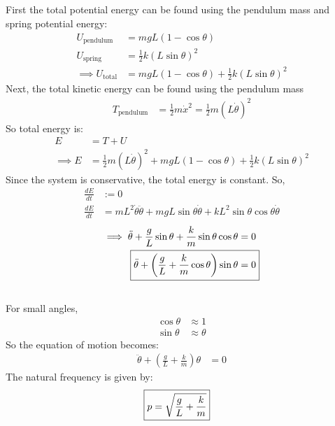 \subsection{}
First the total potential energy can be found using the pendulum mass and spring potential energy:
\begin{align*}
    U_{\text{pendulum}} &= m g L (1 - \cos \theta) \\
    U_{\text{spring}} &= \frac{1}{2} k (L \sin \theta)^2  \\
    \implies U_{\text{total}} &= m g L (1 - \cos \theta) + \frac{1}{2} k (L \sin \theta)^2
\end{align*}
Next, the total kinetic energy can be found using the pendulum mass 
\begin{align*}
    T_{\text{pendulum}} &= \frac{1}{2} m \dot{x}^2  = \frac{1}{2} m (L \dot{\theta})^2 
\end{align*}
So total energy is:
\begin{align*}
    E &= T + U \\
    \implies E &= \frac{1}{2} m (L \dot{\theta})^2 + m g L (1 - \cos \theta) + \frac{1}{2} k (L \sin \theta)^2
\end{align*}
Since the system is conservative, the total energy is constant. So,
\begin{align*}
    \frac{dE}{dt} &:= 0 \\
    \frac{dE}{dt} &= m L^2 \dot{\theta} \ddot{\theta} + m g L \sin \theta \dot{\theta} + k L^2 \sin \theta \cos \theta \dot{\theta} 
\end{align*}
\begin{align*}
    \implies \ddot{\theta} + \frac{g}{L} \sin \theta + \frac{k}{m} \sin \theta \cos \theta &= 0 \\
    \Aboxed{\ddot{\theta} + \left(\frac{g}{L} + \frac{k}{m} \cos \theta\right) \sin \theta &= 0}
\end{align*}

\subsection{}
For small angles,
\begin{align*}
    \cos \theta &\approx 1 \\
    \sin \theta &\approx \theta
\end{align*}
So the equation of motion becomes:
\begin{align*}
    \ddot{\theta} + \left(\frac{g}{L} + \frac{k}{m}\right) \theta &= 0
\end{align*}
The natural frequency is given by:
\begin{align*}
    \Aboxed{p = \sqrt{\frac{g}{L} + \frac{k}{m}}}
\end{align*}

